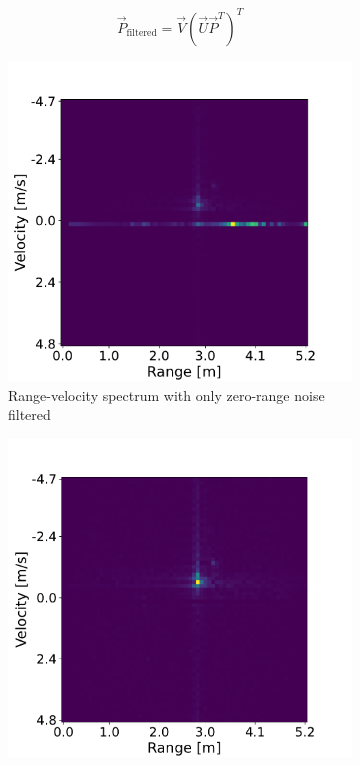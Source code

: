 \begin{equation}
    \label{eq:2dfft-attenuation}
    \vec{P}_{\mathrm{filtered}} = \vec{V} ( \vec{U} \vec{P}^T )^T
\end{equation}

\begin{figure}[H]
    \centering
    \begin{subfigure}[b]{0.49\textwidth}
        \centering
        \includegraphics[width=\textwidth]{fig/4/range-velocity-range-filtered.pdf}
        \caption{Range-velocity spectrum with only zero-range noise filtered}
        \label{fig:range-velocity-range-filtered}
    \end{subfigure}
    \hfill
    \begin{subfigure}[b]{0.49\textwidth}
        \centering
        \includegraphics[width=\textwidth]{fig/4/range-velocity-both-filtered.pdf}

\end{subfigure}
\end{figure}
